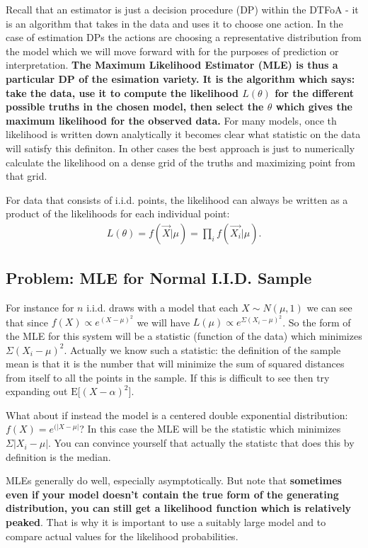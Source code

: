 Recall that an estimator is just a decision procedure (DP) within the DTFoA - it is an algorithm that takes in the data and uses it to choose one action. In the case of estimation DPs the actions are choosing a representative distribution from the model which we will move forward with for the purposes of prediction or interpretation. \textbf{The Maximum Likelihood Estimator (MLE) is thus a particular DP of the esimation variety. It is the algorithm which says: take the data, use it to compute the likelihood $L(\theta)$ for the different possible truths in the chosen model, then select the $\theta$ which gives the maximum likelihood for the observed data.} For many models, once th likelihood is written down analytically it becomes clear what statistic on the data will satisfy this definiton. In other cases the best approach is just to numerically calculate the likelihood on a dense grid of the truths and maximizing point from that grid. 
\newline

For data that consists of i.i.d. points, the likelihood can always be written as a product of the likelihoods for each individual point:
\begin{align*}
L(\theta) = f(\vec{X}|\mu) = \prod_i f(\vec{X_i}|\mu).
\end{align*}

\subsection{Problem: MLE for Normal I.I.D. Sample}
For instance for $n$ i.i.d. draws with a model that each $X \sim N(\mu, 1)$ we can see that since $f(X) \propto e^{(X-\mu)^2}$ we will have $L(\mu) \propto e^{\Sigma (X_i-\mu)^2}$. So the form of the MLE for this system will be a statistic (function of the data) which minimizes $\Sigma (X_i-\mu)^2$. Actually we know such a statistic: the definition of the sample mean is that it is the number that will minimize the sum of squared distances from itself to all the points in the sample. If this is difficult to see then try expanding out $\mathrm{E}\big[(X-\alpha)^2\big]$.
\n

What about if instead the model is a centered double exponential distribution: $f(X) = e^{(|X-\mu|}$? In this case the MLE will be the statistic which minimizes $\Sigma |X_i-\mu|$. You can convince yourself that actually the statistc that does this by definition is the median.
\n

MLEs generally do well, especially asymptotically. But  note that \textbf{sometimes even if your model doesn't contain the true form of the generating distribution, you can still get a likelihood function which is relatively peaked}. That is why it is important to use a suitably large model and to compare actual values for the likelihood probabilities.


